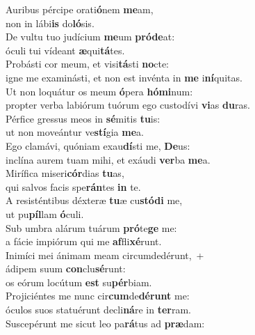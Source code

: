 \evenverse Auribus pércipe orati\textbf{ó}nem \textbf{me}am,~\*\\
\evenverse non in lábi\textbf{is} do\textbf{ló}sis.\\
\oddverse De vultu tuo judícium \textbf{me}um \textbf{pró}\textbf{de}at:~\*\\
\oddverse óculi tui vídeant \textbf{æ}qui\textbf{tá}tes.\\
\evenverse Probásti cor meum, et visi\textbf{tá}sti \textbf{no}cte:~\*\\
\evenverse igne me examinásti, et non est invénta in \textbf{me} i\textbf{ní}quitas.\\
\oddverse Ut non loquátur os meum \textbf{ó}pera \textbf{hó}\textbf{mi}num:~\*\\
\oddverse propter verba labiórum tuórum ego custodívi \textbf{vi}as \textbf{du}ras.\\
\evenverse Pérfice gressus meos in \textbf{sé}mitis \textbf{tu}is:~\*\\
\evenverse ut non moveántur ve\textbf{stí}gia \textbf{me}a.\\
\oddverse Ego clamávi, quóniam exau\textbf{dí}sti me, \textbf{De}us:~\*\\
\oddverse inclína aurem tuam mihi, et exáudi \textbf{ver}ba \textbf{me}a.\\
\evenverse Mirífica miseri\textbf{cór}dias \textbf{tu}as,~\*\\
\evenverse qui salvos facis spe\textbf{rán}tes \textbf{in} te.\\
\oddverse A resisténtibus déxteræ \textbf{tu}æ cu\textbf{stó}\textbf{di} me,~\*\\
\oddverse ut pu\textbf{píl}lam \textbf{ó}culi.\\
\evenverse Sub umbra alárum tuárum \textbf{pró}te\textbf{ge} me:~\*\\
\evenverse a fácie impiórum qui me \textbf{af}fli\textbf{xé}runt.\\
\oddverse Inimíci mei ánimam meam circumdedérunt,~+\\
\oddverse  ádipem suum \textbf{con}clu\textbf{sé}runt:~\*\\
\oddverse os eórum locútum \textbf{est} su\textbf{pér}biam.\\
\evenverse Projiciéntes me nunc cir\textbf{cum}de\textbf{dé}\textbf{runt} me:~\*\\
\evenverse óculos suos statuérunt decli\textbf{ná}re in \textbf{ter}ram.\\
\oddverse Suscepérunt me sicut leo pa\textbf{rá}tus ad \textbf{præ}dam:~\*\\
